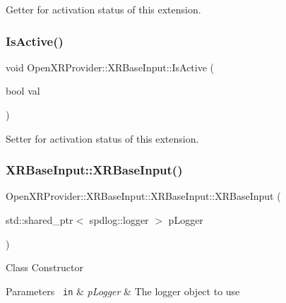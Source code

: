 Getter for activation status of this extension. 

\mbox{\label{class_open_x_r_provider_1_1_x_r_base_input_a0b6bf061caadb5b5199869ab8904e513}} 
\subsubsection{\texorpdfstring{IsActive()}{IsActive()}\hspace{0.1cm}{\footnotesize\ttfamily [2/2]}}
{\footnotesize\ttfamily void Open\+X\+R\+Provider\+::\+X\+R\+Base\+Input\+::\+Is\+Active (\begin{DoxyParamCaption}\item[{bool}]{val }\end{DoxyParamCaption})\hspace{0.3cm}{\ttfamily [inline]}}



Setter for activation status of this extension. 

\mbox{\label{class_open_x_r_provider_1_1_x_r_base_input_aefe33721d76a923f485480f9df30c694}} 
\subsubsection{\texorpdfstring{XRBaseInput::XRBaseInput()}{XRBaseInput::XRBaseInput()}}
{\footnotesize\ttfamily Open\+X\+R\+Provider\+::\+X\+R\+Base\+Input\+::\+X\+R\+Base\+Input\+::\+X\+R\+Base\+Input (\begin{DoxyParamCaption}\item[{std\+::shared\+\_\+ptr$<$ spdlog\+::logger $>$}]{p\+Logger }\end{DoxyParamCaption})\hspace{0.3cm}{\ttfamily [inline]}}

Class Constructor 
\begin{DoxyParams}[1]{Parameters}
\mbox{\texttt{ in}}  & {\em p\+Logger} & The logger object to use \\
\hline
\end{DoxyParams}



